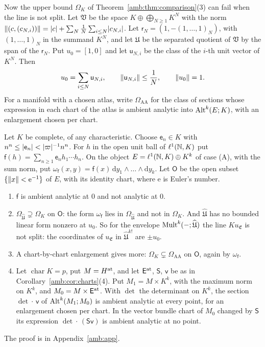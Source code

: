 Now the upper bound $\Omega_K$ of Theorem~\ref{amb:thm:comparison}(3) can fail when the line is not split. Let $\mathfrak V$ be the space $K\oplus\bigoplus_{N\ge1}K^N$ with the norm $\lVert (c,(c_{N,i}))\rVert=\lvert c\rvert+\sum_N\frac1N\sum_{i\le N}\lvert c_{N,i}\rvert$. Let $\mathsf r_N=(1,-(1,\dots,1)_N)$, with $(1,\dots,1)_N$ in the summand $K^N$, and let $\mathfrak U$ be the separated quotient of $\mathfrak V$ by the span of the $\mathsf r_N$. Put $u_0=[1,0]$ and let $\mathsf u_{N,i}$ be the class of the $i$-th unit vector of $K^N$. Then
\begin{equation}\label{amb:c:frakU}
 u_0=\sum_{i\le N}\mathsf u_{N,i},\qquad\lVert \mathsf u_{N,i}\rVert\le\frac1N,\qquad\lVert u_0\rVert=1.
\end{equation}
For a manifold with a chosen atlas, write $\Omega_{\mathrm{AA}}$ for the class of sections whose expression in each chart of the atlas is ambient analytic into $\operatorname{Alt}^k(E;K)$, with an enlargement chosen per chart.

\begin{theorem}\label{amb:thm:more}
Let $K$ be complete, of any characteristic. Choose $\mathsf e_n\in K$ with $n^n\le\lvert \mathsf e_n\rvert<\lvert \varpi\rvert^{-1}n^n$. For $h$ in the open unit ball of $\ell^1(\mathbb N,K)$ put $\mathsf f(h)=\sum_{n\ge1}\mathsf e_nh_1\cdots h_n$. On the object $E=\ell^1(\mathbb N,K)\oplus K^k$ of case (A), with the sum norm, put $\omega_{\mathsf f}(x,y)=\mathsf f(x)\,\mathrm dy_1\wedge\dots\wedge\mathrm dy_k$. Let $\mathsf O$ be the open subset $\{\lVert x\rVert<\mathrm e^{-1}\}$ of $E$, with its identity chart, where $\mathrm e$ is Euler's number.
\begin{enumerate}
\item $\mathsf f$ is ambient analytic at $0$ and not analytic at $0$.
\item $\Omega_{\widehat{\mathfrak U}}\supsetneq\Omega_K$ on $\mathsf O$: the form $\omega_{\mathsf f}$ lies in $\Omega_{\widehat{\mathfrak U}}$ and not in $\Omega_K$. And $\widehat{\mathfrak U}$ has no bounded linear form nonzero at $u_0$. So for the envelope $\operatorname{Mult}^k(-;\widehat{\mathfrak U})$ the line $Ku_{\mathfrak E}$ is not split: the coordinates of $u_{\mathfrak E}$ in $\widehat{\mathfrak U}^{k!}$ are $\pm u_0$.
\item A chart-by-chart enlargement gives more: $\Omega_K\subsetneq\Omega_{\mathrm{AA}}$ on $\mathsf O$, again by $\omega_{\mathsf f}$.
\item Let $\operatorname{char}K=p$, put $M=H^{\rm at}$, and let $\mathsf E^{\rm at}$, $\mathsf S$, $\mathsf v$ be as in Corollary~\ref{amb:cor:charts}(4). Put $M_1=M\times K^k$, with the maximum norm on $K^k$, and $M_0=M\times\mathsf E^{\rm at}$. With $\det$ the determinant on $K^k$, the section $\det\cdot\,\mathsf v$ of $\operatorname{Alt}^k(M_1;M_0)$ is ambient analytic at every point, for an enlargement chosen per chart. In the vector bundle chart of $M_0$ changed by $\mathsf S$ its expression $\det\cdot\,(\mathsf S\mathsf v)$ is ambient analytic at no point.
\end{enumerate}
\end{theorem}
The proof is in Appendix~\ref{amb:app}.

